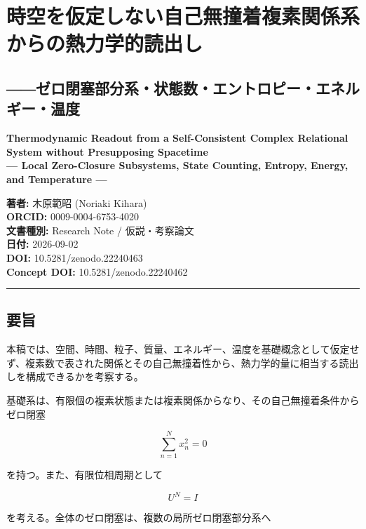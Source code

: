\documentclass[
  a4paper,
]{ltjsarticle}
\author{}
\date{}
\begin{document}
\section{時空を仮定しない自己無撞着複素関係系からの熱力学的読出し}\label{ux6642ux7a7aux3092ux4eeeux5b9aux3057ux306aux3044ux81eaux5df1ux7121ux649eux7740ux8907ux7d20ux95a2ux4fc2ux7cfbux304bux3089ux306eux71b1ux529bux5b66ux7684ux8aadux51faux3057}

\subsection{――ゼロ閉塞部分系・状態数・エントロピー・エネルギー・温度}\label{ux30bcux30edux9589ux585eux90e8ux5206ux7cfbux72b6ux614bux6570ux30a8ux30f3ux30c8ux30edux30d4ux30fcux30a8ux30cdux30ebux30aeux30fcux6e29ux5ea6}

\textbf{Thermodynamic Readout from a Self-Consistent Complex Relational
System without Presupposing Spacetime}\\
\textbf{--- Local Zero-Closure Subsystems, State Counting, Entropy,
Energy, and Temperature ---}

\textbf{著者:} 木原範昭 (Noriaki Kihara)\\
\textbf{ORCID:} 0009-0004-6753-4020\\
\textbf{文書種別:} Research Note / 仮説・考察論文\\
\textbf{日付:} 2026-09-02\\
\textbf{DOI:} 10.5281/zenodo.22240463\\
\textbf{Concept DOI:} 10.5281/zenodo.22240462

\begin{center}\rule{0.5\linewidth}{0.5pt}\end{center}

\subsection{要旨}\label{ux8981ux65e8}

本稿では、空間、時間、粒子、質量、エネルギー、温度を基礎概念として仮定せず、複素数で表された関係とその自己無撞着性から、熱力学的量に相当する読出しを構成できるかを考察する。

基礎系は、有限個の複素状態または複素関係からなり、その自己無撞着条件からゼロ閉塞

\[
\sum_{n=1}^{N} x_n^2 = 0
\]

を持つ。また、有限位相周期として

\[
U^N=I
\]

を考える。全体のゼロ閉塞は、複数の局所ゼロ閉塞部分系へ
\end{document}
